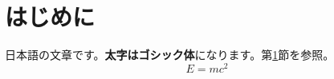 \documentclass[uplatex,dvipdfmx]{jsarticle}
\begin{document}
\section{はじめに}\label{sec:intro}
日本語の文章です。\textbf{太字はゴシック体}になります。第\ref{sec:intro}節を参照。
\begin{equation}
  E = mc^2
\end{equation}
\end{document}
